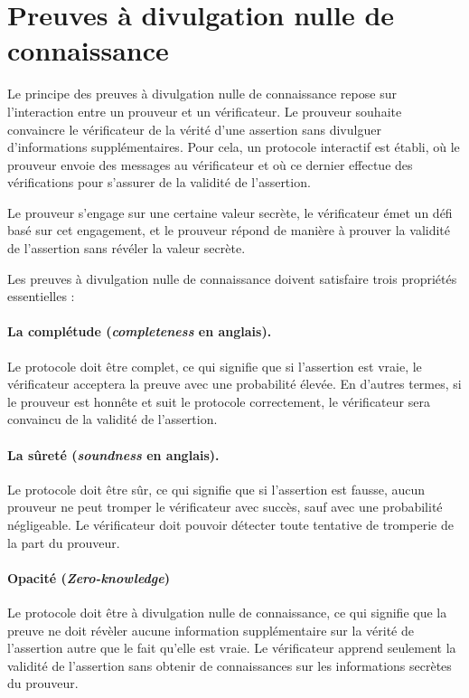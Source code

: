 
\section{Preuves à divulgation nulle de connaissance} %
\label{sec:preuves}
Le principe des preuves à divulgation nulle de connaissance repose sur l'interaction entre un
prouveur et un vérificateur.
Le prouveur souhaite convaincre le vérificateur de la vérité d'une assertion sans divulguer
d'informations supplémentaires.
Pour cela, un protocole interactif est établi, où le prouveur envoie des messages au vérificateur et
où ce dernier effectue des vérifications pour s'assurer de la validité de l'assertion.

Le prouveur s'engage sur une certaine valeur secrète, le vérificateur émet un défi basé sur cet
engagement, et le prouveur répond de manière à prouver la validité de l'assertion sans révéler la
valeur secrète.

Les preuves à divulgation nulle de connaissance doivent satisfaire trois propriétés essentielles :

\paragraph{La complétude (\emph{completeness} en anglais).}

Le protocole doit être complet, ce qui signifie que si l'assertion est vraie, le vérificateur
acceptera la preuve avec une probabilité élevée.
En d'autres termes, si le prouveur est honnête et suit le protocole correctement, le vérificateur
sera convaincu de la validité de l'assertion.

\paragraph{La sûreté (\emph{soundness} en anglais).}

Le protocole doit être sûr, ce qui signifie que si l'assertion est fausse, aucun prouveur ne peut
tromper le vérificateur avec succès, sauf avec une probabilité négligeable.
Le vérificateur doit pouvoir détecter toute tentative de tromperie de la part du prouveur.

\paragraph{Opacité (\emph{Zero-knowledge})}

Le protocole doit être à divulgation nulle de connaissance, ce qui signifie que la preuve ne doit
révèler aucune information supplémentaire sur la vérité de l'assertion autre que le fait qu'elle est
vraie.
Le vérificateur apprend seulement la validité de l'assertion sans obtenir de connaissances sur les
informations secrètes du prouveur.

